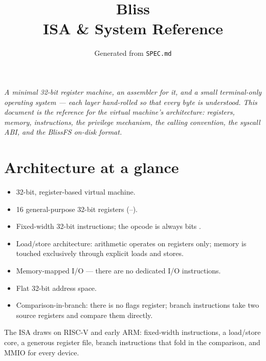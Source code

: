 \documentclass[11pt]{article}
\title{\vspace{-2em}\color{blissaccent}\textbf{\Huge Bliss}\\[0.4em]
  \color{blissink}\Large ISA \& System Reference}
\author{}
\date{Generated from \texttt{SPEC.md}}
\begin{document}
\maketitle
\thispagestyle{empty}

\begin{center}
\begin{minipage}{0.82\linewidth}
\small\itshape
A minimal 32-bit register machine, an assembler for it, and a small
terminal-only operating system --- each layer hand-rolled so that every byte is
understood. This document is the reference for the virtual machine's
architecture: registers, memory, instructions, the privilege mechanism, the
calling convention, the syscall ABI, and the BlissFS on-disk format.
\end{minipage}
\end{center}

\vspace{1em}
\tableofcontents
\vspace{1em}

\section{Architecture at a glance}

\begin{itemize}[leftmargin=1.4em]
  \item 32-bit, register-based virtual machine.
  \item 16 general-purpose 32-bit registers (--).
  \item Fixed-width 32-bit instructions; the opcode is always bits \code{[31:26]}.
  \item Load/store architecture: arithmetic operates on registers only; memory
        is touched exclusively through explicit loads and stores.
  \item Memory-mapped I/O --- there are no dedicated I/O instructions.
  \item Flat 32-bit address space.
  \item Comparison-in-branch: there is no flags register; branch instructions
        take two source registers and compare them directly.
\end{itemize}

\begin{blissnote}
The ISA draws on RISC-V and early ARM: fixed-width instructions, a load/store
core, a generous register file, branch instructions that fold in the comparison,
and MMIO for every device.
\end{blissnote}
\end{document}
